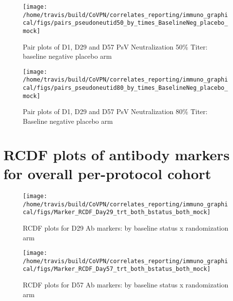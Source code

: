 \documentclass[]{book}
\theoremstyle{definition}
\theoremstyle{definition}
\theoremstyle{definition}
\newcommand{\1}{\mathbbm{1}}
\begin{document}
\begin{figure}[H]

{\centering \texttt{[image: /home/travis/build/CoVPN/correlates\_reporting/immuno\_graphical/figs/pairs\_pseudoneutid50\_by\_times\_BaselineNeg\_placebo\_mock]} 

}

\caption{Pair plots of D1, D29 and D57 PsV Neutralization 50\% Titer: baseline negative placebo arm}\label{fig:unnamed-chunk-19}
\end{figure}

\begin{figure}[H]

{\centering \texttt{[image: /home/travis/build/CoVPN/correlates\_reporting/immuno\_graphical/figs/pairs\_pseudoneutid80\_by\_times\_BaselineNeg\_placebo\_mock]} 

}

\caption{Pair plots of D1, D29 and D57 PsV Neutralization 80\% Titer: Baseline negative placebo arm}\label{fig:unnamed-chunk-20}
\end{figure}

\hypertarget{rcdf-plots-of-antibody-markers-for-overall-per-protocol-cohort}{%
\section{RCDF plots of antibody markers for overall per-protocol cohort}\label{rcdf-plots-of-antibody-markers-for-overall-per-protocol-cohort}}

\begin{figure}[H]

{\centering \texttt{[image: /home/travis/build/CoVPN/correlates\_reporting/immuno\_graphical/figs/Marker\_RCDF\_Day29\_trt\_both\_bstatus\_both\_mock]} 

}

\caption{RCDF plots for D29 Ab markers: by baseline status x randomization arm}\label{fig:unnamed-chunk-21}
\end{figure}

\begin{figure}[H]

{\centering \texttt{[image: /home/travis/build/CoVPN/correlates\_reporting/immuno\_graphical/figs/Marker\_RCDF\_Day57\_trt\_both\_bstatus\_both\_mock]} 

}

\caption{RCDF plots for D57 Ab markers: by baseline status x randomization arm}\label{fig:unnamed-chunk-22}
\end{figure}
\end{document}
